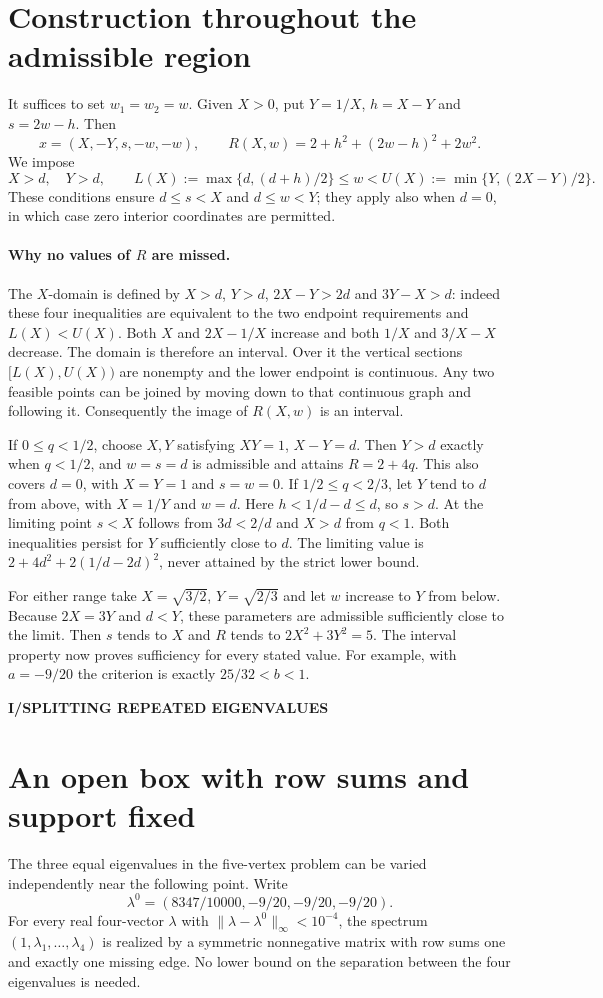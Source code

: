 \documentclass[11pt,a4paper]{article}
\newcommand{\kicker}[1]{\par{\sffamily\bfseries\color{teal}\small #1}\par}
\newcommand{\sect}[1]{\section*{#1}}
\begin{document}
\newpage
\section*{Construction throughout the admissible region}
It suffices to set $w_1=w_2=w$. Given $X>0$, put $Y=1/X$, $h=X-Y$
and $s=2w-h$. Then
\[
       x=(X,-Y,s,-w,-w),\qquad
       R(X,w)=2+h^2+(2w-h)^2+2w^2 .
\]
We impose
\[
 X>d,\quad Y>d,\qquad
 L(X):=\max\{d,(d+h)/2\}\le w
 < U(X):=\min\{Y,(2X-Y)/2\}.
\]
These conditions ensure $d\le s<X$ and $d\le w<Y$; they apply also
when $d=0$, in which case zero interior coordinates are permitted.

\paragraph{Why no values of $R$ are missed.}
The $X$-domain is defined by $X>d$, $Y>d$, $2X-Y>2d$ and
$3Y-X>d$: indeed these four inequalities are equivalent to the two
endpoint requirements and $L(X)<U(X)$. Both $X$ and $2X-1/X$ increase
and both $1/X$ and $3/X-X$ decrease. The domain is therefore an
interval. Over it the vertical sections $[L(X),U(X))$ are nonempty
and the lower endpoint is continuous. Any two feasible points can be
joined by moving down to that continuous graph and following it.
Consequently the image of $R(X,w)$ is an interval.

If $0\le q<1/2$, choose $X,Y$ satisfying $XY=1$, $X-Y=d$. Then
$Y>d$ exactly when $q<1/2$, and $w=s=d$ is admissible and attains
$R=2+4q$. This also covers $d=0$, with $X=Y=1$ and $s=w=0$.
If $1/2\le q<2/3$, let $Y$ tend to $d$ from above, with $X=1/Y$
and $w=d$. Here $h<1/d-d\le d$, so $s>d$. At the limiting point
$s<X$ follows from $3d<2/d$ and $X>d$ from $q<1$. Both inequalities
persist for $Y$ sufficiently close to $d$. The limiting value is
$2+4d^2+2(1/d-2d)^2$, never attained by the strict lower bound.

For either range take $X=\sqrt{3/2}$, $Y=\sqrt{2/3}$ and let $w$
increase to $Y$ from below. Because $2X=3Y$ and $d<Y$, these parameters
are admissible sufficiently close to the limit. Then $s$ tends to $X$
and $R$ tends to $2X^2+3Y^2=5$. The interval property now proves
sufficiency for every stated value. For example, with $a=-9/20$ the
criterion is exactly $25/32<b<1$.
\clearpage
{}
\kicker{I\quad /\quad SPLITTING REPEATED EIGENVALUES}
\sect{An open box with row sums and support fixed}
The three equal eigenvalues in the five-vertex problem can be varied independently near the following point. Write
\[
 \lambda^0=(8347/10000,-9/20,-9/20,-9/20).
\]
For every real four-vector $\lambda$ with $\|\lambda-\lambda^0\|_\infty<10^{-4}$, the spectrum $(1,\lambda_1,\ldots,\lambda_4)$ is realized by a symmetric nonnegative matrix with row sums one and exactly one missing edge. No lower bound on the separation between the four eigenvalues is needed.
\end{document}
